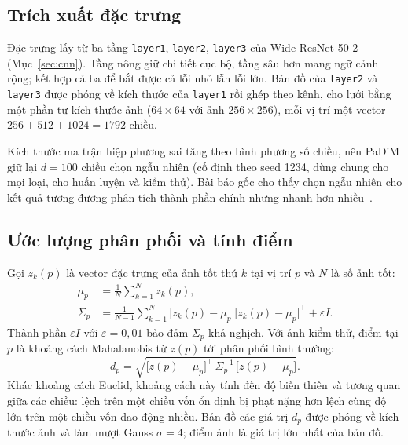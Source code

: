 \subsection{Trích xuất đặc trưng}

Đặc trưng lấy từ ba tầng \texttt{layer1}, \texttt{layer2}, \texttt{layer3} của
Wide-ResNet-50-2~\cite{zagoruykoWideResidualNetworks2016} (Mục~\ref{sec:cnn}). Tầng nông giữ chi tiết cục bộ, tầng
sâu hơn mang ngữ cảnh rộng; kết hợp cả ba để bắt được cả lỗi nhỏ lẫn lỗi lớn. Bản đồ của \texttt{layer2} và
\texttt{layer3} được phóng về kích thước của \texttt{layer1} rồi ghép theo kênh, cho lưới bằng một phần tư kích thước
ảnh ($64\times64$ với ảnh $256\times256$), mỗi vị trí một vector $256+512+1024 = 1792$ chiều.

Kích thước ma trận hiệp phương sai tăng theo bình phương số chiều, nên PaDiM giữ lại $d = 100$ chiều chọn ngẫu nhiên
(cố định theo seed 1234, dùng chung cho mọi loại, cho huấn luyện và kiểm thử). Bài báo gốc cho thấy chọn ngẫu nhiên
cho kết quả tương đương phân tích thành phần chính nhưng nhanh hơn nhiều~\cite{defardPaDiMPatchDistribution2021}.

\subsection{Ước lượng phân phối và tính điểm}

Gọi $z_k(p)$ là vector đặc trưng của ảnh tốt thứ $k$ tại vị trí $p$ và $N$ là số ảnh tốt:
\begin{align}
  \mu_p &= \frac{1}{N}\sum_{k=1}^{N} z_k(p), \label{eq:padim-mean}\\
  \Sigma_p &= \frac{1}{N-1}\sum_{k=1}^{N}\bigl[z_k(p)-\mu_p\bigr]\bigl[z_k(p)-\mu_p\bigr]^{\top} + \varepsilon I .
  \label{eq:padim-cov}
\end{align}
Thành phần $\varepsilon I$ với $\varepsilon = 0{,}01$ bảo đảm $\Sigma_p$ khả nghịch. Với ảnh kiểm thử, điểm tại $p$
là khoảng cách Mahalanobis từ $z(p)$ tới phân phối bình thường:
\begin{equation}
  d_p = \sqrt{\bigl[z(p)-\mu_p\bigr]^{\top}\,\Sigma_p^{-1}\,\bigl[z(p)-\mu_p\bigr]} .
  \label{eq:padim-mahalanobis}
\end{equation}
Khác khoảng cách Euclid, khoảng cách này tính đến độ biến thiên và tương quan giữa các chiều: lệch trên một chiều
vốn ổn định bị phạt nặng hơn lệch cùng độ lớn trên một chiều vốn dao động nhiều. Bản đồ các giá trị $d_p$ được phóng
về kích thước ảnh và làm mượt Gauss $\sigma = 4$; điểm ảnh là giá trị lớn nhất của bản đồ.

